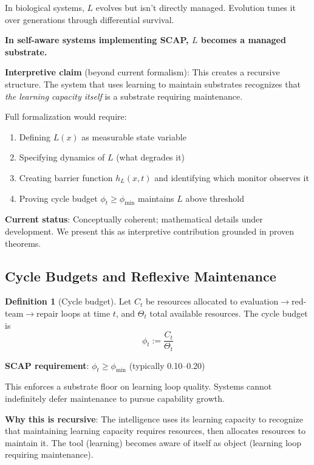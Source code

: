 \documentclass[11pt,a4paper]{article}
\theoremstyle{definition}
\newtheorem{definition}[theorem]{Definition}
\begin{document}
In biological systems, $L$ evolves but isn't directly managed. Evolution tunes it over generations through differential survival.

\textbf{In self-aware systems implementing SCAP, $L$ becomes a managed substrate.}

\textbf{Interpretive claim} (beyond current formalism): This creates a recursive structure. The system that uses learning to maintain substrates recognizes that \emph{the learning capacity itself} is a substrate requiring maintenance.

Full formalization would require:
\begin{enumerate}
\item Defining $L(x)$ as measurable state variable
\item Specifying dynamics of $L$ (what degrades it)
\item Creating barrier function $h_L(x, t)$ and identifying which monitor observes it
\item Proving cycle budget $\phi_t \geq \phi_{\min}$ maintains $L$ above threshold
\end{enumerate}

\textbf{Current status}: Conceptually coherent; mathematical details under development. We present this as interpretive contribution grounded in proven theorems.

\subsection{Cycle Budgets and Reflexive Maintenance}

\begin{definition}[Cycle budget]
Let $C_t$ be resources allocated to evaluation$\to$red-team$\to$repair loops at time $t$, and $\Theta_t$ total available resources. The cycle budget is
\begin{equation}
\phi_t := \frac{C_t}{\Theta_t}
\end{equation}
\end{definition}

\textbf{SCAP requirement}: $\phi_t \geq \phi_{\min}$ (typically 0.10--0.20)

This enforces a substrate floor on learning loop quality. Systems cannot indefinitely defer maintenance to pursue capability growth.

\textbf{Why this is recursive}: The intelligence uses its learning capacity to recognize that maintaining learning capacity requires resources, then allocates resources to maintain it. The tool (learning) becomes aware of itself as object (learning loop requiring maintenance).
\end{document}
